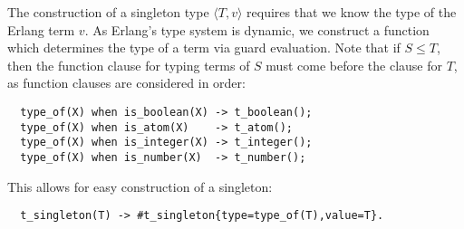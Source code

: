 \documentclass[nonacm,timestamp,manuscript]{acmart}
\newcommand{\singleton}[2]{\langle #1, #2 \rangle} %
\newcommand{\singletonex}{\singleton{T}{v}}
\begin{document}
The construction of a singleton type $\singletonex$ requires that we know the
type of the Erlang term $v$. As Erlang's type system is dynamic, we construct
a function which determines the type of a term via guard evaluation. Note that if
$S \le T$, then the function clause for typing terms of $S$ must come before the
clause for $T$, as function clauses are considered in order:

\begin{verbatim}
  type_of(X) when is_boolean(X) -> t_boolean();
  type_of(X) when is_atom(X)    -> t_atom();
  type_of(X) when is_integer(X) -> t_integer();
  type_of(X) when is_number(X)  -> t_number();
\end{verbatim}

This allows for easy construction of a singleton:
\begin{verbatim}
  t_singleton(T) -> #t_singleton{type=type_of(T),value=T}.
\end{verbatim}




\end{document}
